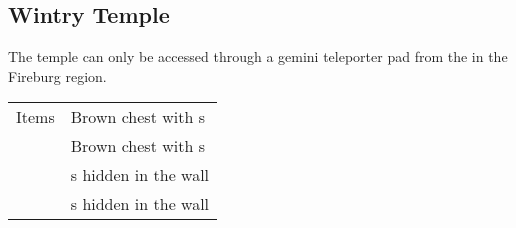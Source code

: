 \subsection{Wintry Temple}
\label{map:wintry_temple}

The temple can only be accessed through a gemini teleporter pad from the  in the Fireburg region.

\noindent\begin{tabularx}{\textwidth}[l]{lX}
	Items
	& Brown chest with \nameref{item:cure_potion}s \\
	& Brown chest with \nameref{item:heal_potion}s \\
	& \nameref{weapon:bomb}s hidden in the wall \\
	& \nameref{item:refresher}s hidden in the wall
\end{tabularx}
